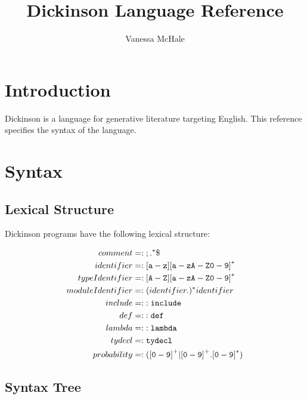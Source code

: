 \documentclass{report}
\begin{document}
\title{Dickinson Language Reference}
\author {Vanessa McHale}
\maketitle

\tableofcontents

\section{Introduction}

Dickinson is a language for generative literature targeting English. This reference specifies the syntax of the language.

\section{Syntax}

\subsection{Lexical Structure}

Dickinson programs have the following lexical structure:

\begin{align*}
    comment &=: {\tt ; .}^*\$ \\
    identifier &=: {\tt [a-z][a-zA-Z0-9]}^* \\
    typeIdentifier &=: {\tt [A-Z][a-zA-Z0-9]}^* \\
    moduleIdentifier &=: (identifier.)^* identifier \\
    include &=: {\tt :include} \\
    def &=: {\tt :def} \\
    lambda &=: {\tt :lambda} \\
    tydecl &=: {\tt tydecl} \\
    probability &=: ({\tt [0-9]}^+| {\tt [0-9]}^+.{\tt [0-9]}^*)
\end{align*}

\subsection{Syntax Tree}

\setlength{\grammarparsep}{20pt plus 1pt minus 1pt}
\setlength{\grammarindent}{12em}
\end{document}
